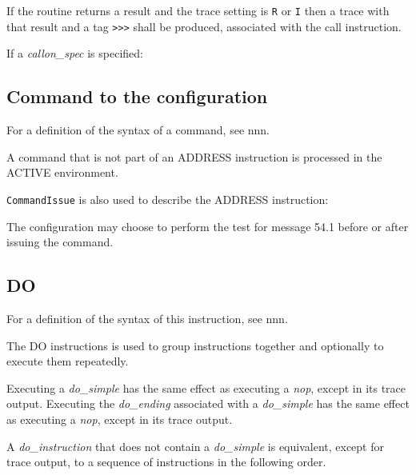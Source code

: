If the routine returns a result and the trace setting is
\texttt{\textquotesingle{}R\textquotesingle{}} or
\texttt{\textquotesingle{}I\textquotesingle{}} then a trace with that
result and a tag
\texttt{\textquotesingle{}\textgreater{}\textgreater{}\textgreater{}\textquotesingle{}}
shall be produced, associated with the call instruction.

If a \emph{callon\_spec} is specified:



\subsection{Command to the
configuration}\label{command-to-the-configuration}

For a definition of the syntax of a command, see nnn.

A command that is not part of an ADDRESS instruction is processed in the
ACTIVE environment.



\texttt{CommandIssue} is also used to describe the ADDRESS instruction:



The configuration may choose to perform the test for message 54.1 before
or after issuing the command.

\subsection{DO}\label{do}

For a definition of the syntax of this instruction, see nnn.

The DO instructions is used to group instructions together and
optionally to execute them repeatedly.

Executing a \emph{do\_simple} has the same effect as executing a
\emph{nop}, except in its trace output. Executing the \emph{do\_ending}
associated with a \emph{do\_simple} has the same effect as executing a
\emph{nop}, except in its trace output.

A \emph{do\_instruction} that does not contain a \emph{do\_simple} is
equivalent, except for trace output, to a sequence of instructions in
the following order.

